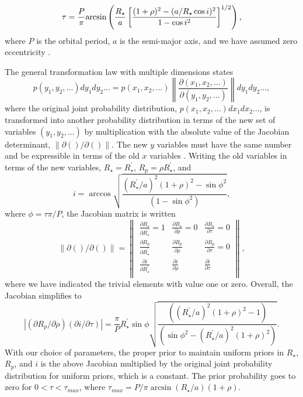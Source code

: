 \documentclass{emulateapj}
\begin{document}
\begin{equation}
\tau=\frac{P}{\pi}{\rm arcsin}\left(\frac{R_{\star}}{a}\left[\frac{(1+\rho)^{2}-(a/R_{\star}\cos{i})^{2}}{1-\cos{i}^{2}}\right]^{1/2}\right),
\label{eq:tau}
\end{equation}
where $P$ is the orbital period, $a$ is the semi-major axis, and we
have assumed zero eccentricity \citep{SEA03}.

The general transformation law
with multiple dimensions states
\begin{equation}
p(y_{1},y_{2},...)dy_{1}dy_{2}...=p(x_{1},x_{2},...)\left\| \frac{\partial (x_{1},x_{2},...)}{\partial (y_{1},y_{2},...)} \right\| dy_{1}dy_{2}...,
\end{equation}
where the original joint probability distribution,
$p(x_{1},x_{2},...)dx_{1}dx_{2}...$, is transformed into another
probability distribution in terms of the new set of variables
$(y_{1},y_{2},...)$ by multiplication with the absolute value of the
Jacobian determinant, $\| \partial ()/\partial () \| $.  The new $y$
variables must have the same number and be expressible in terms of the
old $x$ variables \citep{PRE92}.  Writing the old variables in terms of the new variables, $R_{\star}=R_{\star}^{\prime}$, $R_{p}=\rho R_{\star}^{\prime}$, and
\begin{equation}
i=\arccos{\sqrt{\frac{(R_{\star}^{\prime}/a)^{2}(1+\rho)^{2}-\sin{\phi}^2}{(1-\sin{\phi}^{2})}}},
\end{equation}
where $\phi=\tau \pi/P$, the Jacobian matrix is written
\begin{equation}
\| \partial ()/\partial () \|=\left\| \begin{array}{ccc}
\frac{\partial R_{\star}}{\partial R_{\star}^{\prime}}=1 & \frac{\partial R_{\star}}{\partial \rho}=0 & \frac{\partial R_{\star}}{\partial \tau}=0 \\
\frac{\partial R_{p}}{\partial R_{\star}^{\prime}} & \frac{\partial R_{p}}{\partial \rho} & \frac{\partial R_{p}}{\partial \tau}=0 \\
\frac{\partial i}{\partial R_{\star}^{\prime}} & \frac{\partial i}{\partial \rho} & \frac{\partial i}{\partial \tau} \\
\end{array}\right\|,
\end{equation}
where we have indicated the trivial elements with value one or zero.  Overall, the Jacobian simplifies to
\begin{equation}
| (\partial R_{p}/\partial \rho)(\partial i/\partial \tau) |=\frac{\pi}{P} R_{\star}^{\prime}\sin{\phi}\sqrt{\frac{((R_{\star}^{\prime}/a)^{2}(1+\rho)^{2}-1)}{(\sin{\phi}^{2}-(R_{\star}^{\prime}/a)^{2}(1+\rho)^{2})}}.
\label{eq:unipri}
\end{equation}
With our choice of parameters, the proper prior to maintain uniform
priors in $R_{\star}$, $R_{p}$, and $i$ is the above Jacobian
multiplied by the original joint probability distribution for uniform
priors, which is a constant.  The prior probability goes to zero for $0<
\tau <
\tau_{max}$, where $\tau_{max}=P/\pi \arcsin{(R_{\star}/a)(1+\rho)}$.
\end{document}
